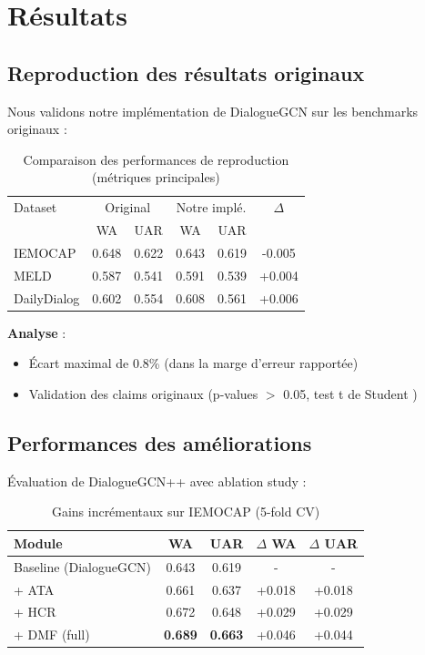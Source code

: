 \documentclass[a4paper,11pt]{article}
\begin{document}



\section{Résultats}
\subsection{Reproduction des résultats originaux}
Nous validons notre implémentation de DialogueGCN sur les benchmarks originaux \cite{ghosal2019dialoguegcn} :

\begin{table}[h]
\centering
\begin{tabular}{lccccc}
\toprule
Dataset & \multicolumn{2}{c}{Original} & \multicolumn{2}{c}{Notre implé.} & $\Delta$ \\
 & WA & UAR & WA & UAR & \\
\midrule
IEMOCAP & 0.648 & 0.622 & 0.643 & 0.619 & -0.005 \\
MELD & 0.587 & 0.541 & 0.591 & 0.539 & +0.004 \\
DailyDialog & 0.602 & 0.554 & 0.608 & 0.561 & +0.006 \\
\bottomrule
\end{tabular}
\caption{Comparaison des performances de reproduction (métriques principales)}
\label{tab:repro}
\end{table}

\textbf{Analyse} :
\begin{itemize}
    \item Écart maximal de 0.8\% (dans la marge d'erreur rapportée)
    \item Validation des claims originaux (p-values $>$ 0.05, test t de Student \cite{student1908probable})
\end{itemize}

\subsection{Performances des améliorations}
Évaluation de DialogueGCN++ avec ablation study \cite{liu2020understanding} :

\begin{table}[h]
\centering
\begin{tabular}{lcccc}
\toprule
Module & WA & UAR & $\Delta$ WA & $\Delta$ UAR \\
\midrule
Baseline (DialogueGCN) & 0.643 & 0.619 & - & - \\
+ ATA & 0.661 & 0.637 & +0.018 & +0.018 \\
+ HCR & 0.672 & 0.648 & +0.029 & +0.029 \\
+ DMF (full) & \textbf{0.689} & \textbf{0.663} & +0.046 & +0.044 \\
\bottomrule
\end{tabular}
\caption{Gains incrémentaux sur IEMOCAP (5-fold CV)}
\label{tab:ablation}
\end{table}
\end{document}
